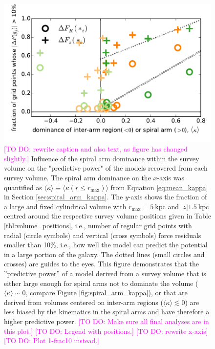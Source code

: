 \documentclass[iop,revtex4,numberedappendix,appendixfloats]{emulateapj}
\newcommand{\Wilma}[1]{\textcolor{Magenta}{#1}}
\begin{document}
\begin{figure}[!htbp]
\centering
\includegraphics[width=\columnwidth]{fig/MNdHHdiffSph2_plot_meankappa_vs_frac10grid_2.pdf}
\caption{\Wilma{[TO DO: rewrite caption and also text, as figure has changed slightly.]} Influence of the spiral arm dominance within the survey volume on the "predictive power" of the models recovered from each survey volume. The spiral arm dominance on the $x$-axis was quantified as $\langle \kappa \rangle \equiv \langle \kappa(r\leq r_\text{max})\rangle$ from Equation \eqref{eq:mean_kappa} in Section \ref{sec:spiral_arm_kappa}. The $y$-axis shows the fraction of a large and fixed cylindrical volume with $r_\text{max}=5~\text{kpc}$ and $|z|1.5~\text{kpc}$ centred around the respective survey volume positions given in Table \ref{tbl:volume_positions}, i.e., number of regular grid points with radial (circle symbols) and vertical (cross symbols) force residuals smaller than 10\%, i.e., how well the model can predict the potential in a large portion of the galaxy. The dotted lines (small circles and crosses) are guides to the eyes. This figure demonstrates that the ''predictive power'' of a model derived from a survey volume that is either large enough for spiral arms not to dominate the volume ($\langle \kappa \rangle \sim 0$, compare Figure \ref{fig:spiral_arm_kappa}), or that are derived from volumes centered on inter-arm regions ($\langle \kappa \rangle \lesssim 0$) are less biased by the kinematics in the spiral arms and have therefore a higher predictive power. \Wilma{[TO DO: Make sure all final analyses are in this plot.]} \Wilma{[TO DO: Legend with positions.]} \Wilma{[TO DO: rewrite x-axis]} \Wilma{[TO DO: Plot 1-frac10 instead.]}}
\label{fig:mean_kappa_vs_frac10_grid}
\end{figure}
\end{document}
